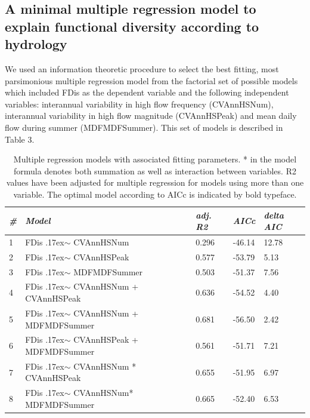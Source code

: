 \documentclass[openright,12pt,a4paper]{memoir}
\begin{document}
\subsection{A minimal multiple regression model to explain functional diversity according to hydrology}
We used an information theoretic procedure to select the best fitting, most parsimonious multiple regression model from the factorial set of possible models which included FDis as the dependent variable and the following independent variables: interannual variability in high flow frequency (CVAnnHSNum), interannual variability in high flow magnitude (CVAnnHSPeak) and mean daily flow during summer (MDFMDFSummer). This set of models is described in Table 3.
\begin{landscape}
\begin{table}[ht]
\tiny
\centering
\caption[Multiple regression models with associated fitting parameters.]{\small{Multiple regression models with associated fitting parameters. * in the model formula denotes both summation as well as interaction between variables. R2 values have been adjusted for multiple regression for models using more than one variable. The optimal model according to AICc is indicated by bold typeface.}}
\label{Ch3_T3}
{\tabulinesep=1.2mm
\begin{tabu}to 
\hline
\textit{\#} & \textit{Model} & \textit{adj. R2} & \textit{AICc} & \textit{delta AIC} \\  & FDis {\raise.17ex\hbox{$\scriptstyle\mathtt{\sim}$}} CVAnnHSNum & 0.296 & -46.14 & 12.78 \\
2 & FDis {\raise.17ex\hbox{$\scriptstyle\mathtt{\sim}$}} CVAnnHSPeak & 0.577 & -53.79 & 5.13 \\
3 & FDis {\raise.17ex\hbox{$\scriptstyle\mathtt{\sim}$}} MDFMDFSummer & 0.503 & -51.37 & 7.56 \\
4 & FDis {\raise.17ex\hbox{$\scriptstyle\mathtt{\sim}$}} CVAnnHSNum + CVAnnHSPeak & 0.636 & -54.52 & 4.40 \\
5 & FDis {\raise.17ex\hbox{$\scriptstyle\mathtt{\sim}$}} CVAnnHSNum + MDFMDFSummer & 0.681 & -56.50 & 2.42 \\
6 & FDis {\raise.17ex\hbox{$\scriptstyle\mathtt{\sim}$}} CVAnnHSPeak + MDFMDFSummer & 0.561 & -51.71 & 7.21 \\
7 & FDis {\raise.17ex\hbox{$\scriptstyle\mathtt{\sim}$}} CVAnnHSNum * CVAnnHSPeak & 0.655 & -51.95 & 6.97 \\
8 & FDis {\raise.17ex\hbox{$\scriptstyle\mathtt{\sim}$}} CVAnnHSNum* MDFMDFSummer & 0.665 & -52.40 & 6.53 \\

\end{tabu}}
\end{table}
\end{landscape}
\end{document}
